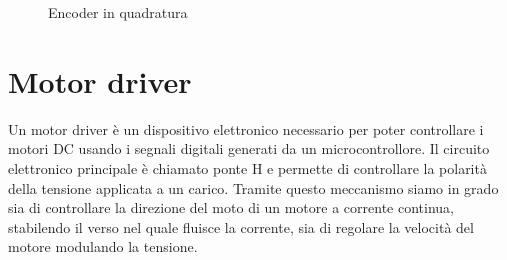 \begin{figure}[H]
\hfill
{}
\hfill
{}
\hfill
\caption{Encoder in quadratura}
\end{figure}

\section{Motor driver}
Un motor driver è un dispositivo elettronico necessario per poter controllare i motori DC usando i segnali digitali generati da un microcontrollore.
Il circuito elettronico principale è chiamato ponte H e permette di controllare la polarità della tensione applicata a un carico. Tramite questo meccanismo siamo in grado sia di controllare la direzione del moto di un motore a corrente continua, stabilendo il verso nel quale fluisce la corrente, sia di regolare la velocità del motore modulando la tensione.

